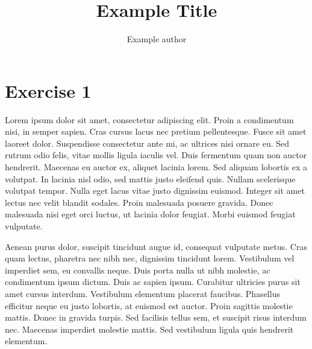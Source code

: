 
\def\lutilpath{../..}



\title{Example Title}
\author{Example author}
\date{}



\maketitle
\thispagestyle{fancy}

\section{Exercise 1}

Lorem ipsum dolor sit amet, consectetur adipiscing elit. Proin a condimentum nisi, in semper sapien. Cras cursus lacus nec pretium pellentesque. Fusce sit amet laoreet dolor. Suspendisse consectetur ante mi, ac ultrices nisi ornare eu. Sed rutrum odio felis, vitae mollis ligula iaculis vel. Duis fermentum quam non auctor hendrerit. Maecenas eu auctor ex, aliquet lacinia lorem. Sed aliquam lobortis ex a volutpat. In lacinia nisl odio, sed mattis justo eleifend quis. Nullam scelerisque volutpat tempor. Nulla eget lacus vitae justo dignissim euismod. Integer sit amet lectus nec velit blandit sodales. Proin malesuada posuere gravida. Donec malesuada nisi eget orci luctus, ut lacinia dolor feugiat. Morbi euismod feugiat vulputate.

Aenean purus dolor, suscipit tincidunt augue id, consequat vulputate metus. Cras quam lectus, pharetra nec nibh nec, dignissim tincidunt lorem. Vestibulum vel imperdiet sem, eu convallis neque. Duis porta nulla ut nibh molestie, ac condimentum ipsum dictum. Duis ac sapien ipsum. Curabitur ultricies purus sit amet cursus interdum. Vestibulum elementum placerat faucibus. Phasellus efficitur neque eu justo lobortis, at euismod est auctor. Proin sagittis molestie mattis. Donec in gravida turpis. Sed facilisis tellus sem, et suscipit risus interdum nec. Maecenas imperdiet molestie mattis. Sed vestibulum ligula quis hendrerit elementum.


